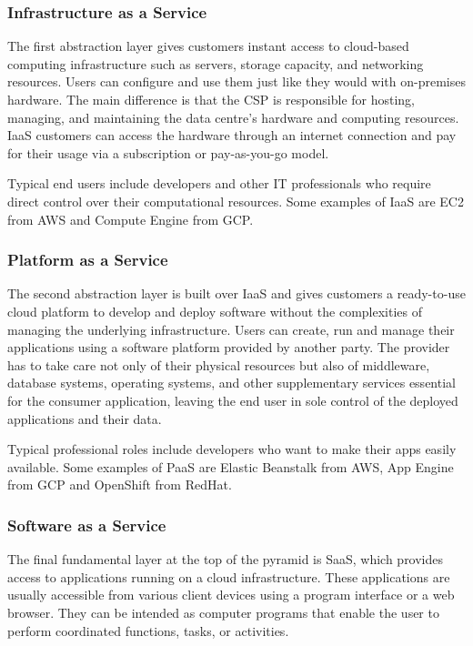 \documentclass[../thesis.tex]{subfiles}
\begin{document}
\subsubsection{Infrastructure as a Service}
The first abstraction layer gives customers instant access to cloud-based computing infrastructure such as servers, storage capacity, and networking resources. Users can configure and use them just like they would with on-premises hardware. The main difference is that the \acrfull{CSP} is responsible for hosting, managing, and maintaining the data centre's hardware and computing resources. IaaS customers can access the hardware through an internet connection and pay for their usage via a subscription or pay-as-you-go model.

Typical end users include developers and other IT professionals who require direct control over their computational resources. Some examples of IaaS are \acrlong{EC2} from \acrfull{AWS} and Compute Engine from \acrfull{GCP}.

\subsubsection{Platform as a Service}
The second abstraction layer is built over IaaS and gives customers a ready-to-use cloud platform to develop and deploy software without the complexities of managing the underlying infrastructure. Users can create, run and manage their applications using a software platform provided by another party. The provider has to take care not only of their physical resources but also of middleware, database systems, operating systems, and other supplementary services essential for the consumer application, leaving the end user in sole control of the deployed applications and their data.

Typical professional roles include developers who want to make their apps easily available. Some examples of PaaS are Elastic Beanstalk from \acrshort{AWS}, App Engine from \acrshort{GCP} and OpenShift from RedHat.

\subsubsection{Software as a Service}
The final fundamental layer at the top of the pyramid is SaaS, which provides access to applications running on a cloud infrastructure. These applications are usually accessible from various client devices using a program interface or a web browser. They can be intended as computer programs that enable the user to perform coordinated functions, tasks, or activities.
\end{document}

